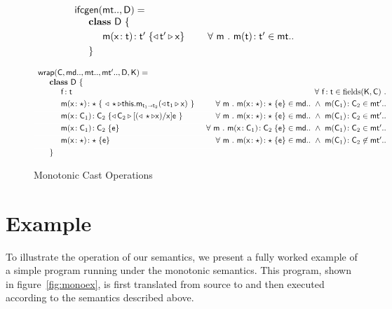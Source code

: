 \documentclass[sigconf]{acmart}
\begin{document}
\begin{figure*}
\vspace{5mm}

\begin{center}\begin{minipage}{12cm}
\noindent\[\begin{array}{l@{~}r@{}r@{~}r@{~}r@{~}rr}
\arrayrulecolor{white}
\typegen{\mt..}{\D} = \\
\SP \class~\D~\{
\\[1mm]
\SPP \Mdef\m\x\t\tp {{\MonCast\tp{\x}}} 
&
\qquad \All m \Mtype\m\t\tp\in\mt..
\\[1mm]
\SP\}
\end{array}
\]

\vspace{5mm}

\[\begin{array}{l@{~}r@{}r@{~}r@{~}r@{~}rr}
\arrayrulecolor{white}
\classgen{\C, \md.., \mt.., \mtp.., \D, \K}= \\
  \SP \class~\D~\{ \\
    \SPP \Fdef\f\t   &
        \All{\f\!:\t\in\text{fields}(\K,\C)} \\[1mm]
    \SPP \Mdef\m\x\any\any{~\MonCast\any{\KCall\this\m{\MonCast{\t[1]}\x}{\t[1]}{\t[2]}}~}\HS\HS & 
          \All\m \Mdef\m\x{\any}{\any}\e\in\md..  ~\AND~ \Mtype\m{\C_1}{\C_2}\in{\mtp..}
\\[1mm]\hline
\SPP \Mdef\m\x{\C_1}{\C_2} {\MonCast{\C_2}{[{(\MonCast{\any}\x)}/\x]\e}~}
&     \All \m \Mdef\m\x{\any}{\any}\e\in\md.. ~\AND~ \Mtype\m{\C_1}{\C_2}\in\mtp.. 
\\[1mm]\hline
\SPP \Mdef\m\x{\C_1}{\C_2} {\e}~
&     \All \m \Mdef\m\x{\C_1}{\C_2}\e\in\md.. ~\AND~ \Mtype\m{\C_1}{\C_2}\in\mtp.. 
\\[1mm]\hline
\SPP \Mdef\m\x{\any}{\any} {\e}~
&     \All \m \Mdef\m\x{\any}{\any}\e\in\md.. ~\AND~ \Mtype\m{\C_1}{\C_2}\not\in\mtp.. 
\\[1mm]\hline
\SP\}
\end{array}
\]\end{minipage}\end{center}
\caption{Monotonic Cast Operations}
\label{moncast}
\end{figure*}

\section{Example}

To illustrate the operation of our semantics, we present a fully worked
example of a simple program running under the monotonic semantics. This
program, shown in figure~\ref{fig:monoex}, is first translated from source
to \kafka and then executed according to the \kafka semantics described
above.
\end{document}
